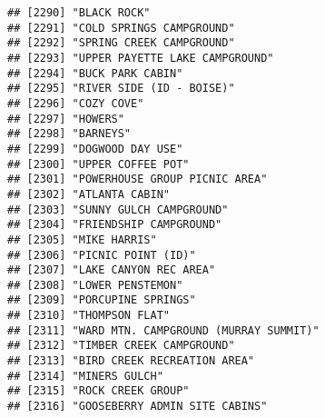 \documentclass[
]{article}
\begin{document}
\begin{verbatim}
## [2290] "BLACK ROCK"                                                                          
## [2291] "COLD SPRINGS CAMPGROUND"                                                             
## [2292] "SPRING CREEK CAMPGROUND"                                                             
## [2293] "UPPER PAYETTE LAKE CAMPGROUND"                                                       
## [2294] "BUCK PARK CABIN"                                                                     
## [2295] "RIVER SIDE (ID - BOISE)"                                                             
## [2296] "COZY COVE"                                                                           
## [2297] "HOWERS"                                                                              
## [2298] "BARNEYS"                                                                             
## [2299] "DOGWOOD DAY USE"                                                                     
## [2300] "UPPER COFFEE POT"                                                                    
## [2301] "POWERHOUSE GROUP PICNIC AREA"                                                        
## [2302] "ATLANTA CABIN"                                                                       
## [2303] "SUNNY GULCH CAMPGROUND"                                                              
## [2304] "FRIENDSHIP CAMPGROUND"                                                               
## [2305] "MIKE HARRIS"                                                                         
## [2306] "PICNIC POINT (ID)"                                                                   
## [2307] "LAKE CANYON REC AREA"                                                                
## [2308] "LOWER PENSTEMON"                                                                     
## [2309] "PORCUPINE SPRINGS"                                                                   
## [2310] "THOMPSON FLAT"                                                                       
## [2311] "WARD MTN. CAMPGROUND (MURRAY SUMMIT)"                                                
## [2312] "TIMBER CREEK CAMPGROUND"                                                             
## [2313] "BIRD CREEK RECREATION AREA"                                                          
## [2314] "MINERS GULCH"                                                                        
## [2315] "ROCK CREEK GROUP"                                                                    
## [2316] "GOOSEBERRY ADMIN SITE CABINS"                                                        

\end{verbatim}
\end{document}
